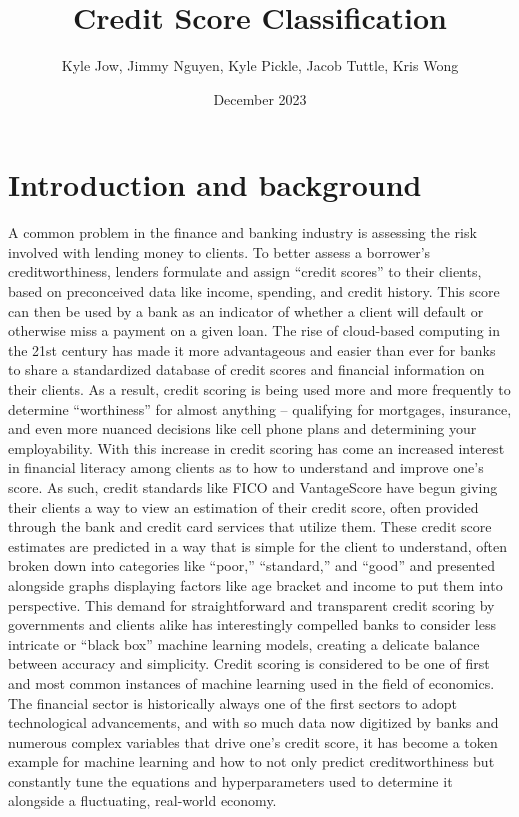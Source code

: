 \documentclass{article}
\title{\textbf{Credit Score Classification}}
\author{Kyle Jow, Jimmy Nguyen, Kyle Pickle, Jacob Tuttle, Kris Wong}
\date{December 2023}
\begin{document}
\maketitle
\newpage
{}
\pagestyle{fancy}
\fancyhf{} %
\fancyfoot[R]{\thepage}
\section*{Introduction and background}
A common problem in the finance and banking industry is assessing the risk involved with lending money to clients.
To better assess a borrower's creditworthiness, lenders formulate and assign “credit scores” to their clients, based on preconceived data 
like income, spending, and credit history.
This score can then be used by a bank as an indicator of whether a client will default or otherwise miss a payment on a given loan.
The rise of cloud-based computing in the 21st century has made it more advantageous and easier than ever for banks to share a
standardized database of credit scores and financial information on their clients.
As a result, credit scoring is being used more and more frequently to determine “worthiness” for almost anything -- qualifying for
mortgages, insurance, and even more nuanced decisions like cell phone plans and determining your employability.
\vspace{5mm}\newline
With this increase in credit scoring has come an increased interest in financial literacy among clients as to how to understand and improve
one's score.
As such, credit standards like FICO and VantageScore have begun giving their clients a way to view an estimation of their credit score, often
provided through the bank and credit card services that utilize them.
These credit score estimates are predicted in a way that is simple for the client to understand, often broken down into categories like
“poor,” “standard,” and “good” and presented alongside graphs displaying factors like age bracket and income to put them into perspective.
This demand for straightforward and transparent credit scoring by governments and clients alike has interestingly compelled banks to
consider less intricate or “black box” machine learning models, creating a delicate balance between accuracy and simplicity.
\vspace{5mm}\newline
Credit scoring is considered to be one of first and most common instances of machine learning used in the field of economics.
The financial sector is historically always one of the first sectors to adopt technological advancements, and with so much data now
digitized by banks and numerous complex variables that drive one's credit score, it has become a token example for machine learning
and how to not only predict creditworthiness but constantly tune the equations and hyperparameters used to determine it alongside a
fluctuating, real-world economy.
\end{document}
